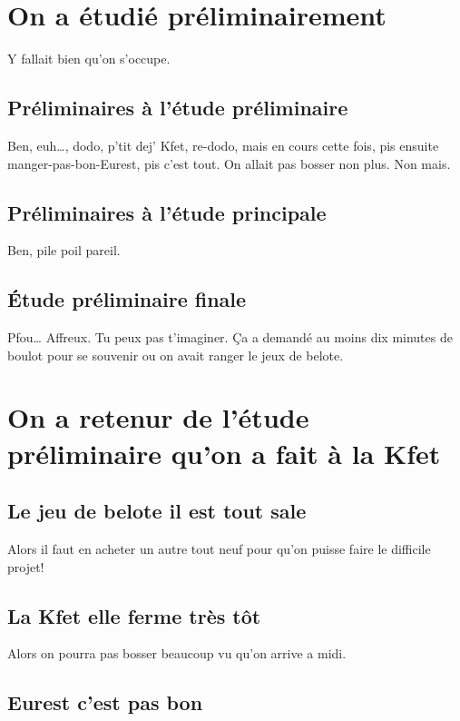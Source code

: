 \documentclass[french,12pt, a4paper,twoside,openright]{report}
\begin{document}
\chapter{On a \'etudi\'e pr\'eliminairement}

Y fallait bien qu'on s'occupe.

\section{Pr\'eliminaires \`a l'\'etude pr\'eliminaire}

Ben, euh\ldots, dodo, p'tit dej' Kfet, re-dodo, mais en cours cette fois,
pis ensuite manger-pas-bon-Eurest, pis c'est tout. On allait pas bosser
non plus. Non mais.

\section{Pr\'eliminaires \`a l'\'etude principale}

Ben, pile poil pareil.

\section{\'Etude pr\'eliminaire finale}

Pfou\ldots{} Affreux. Tu peux pas t'imaginer. \c{C}a a demand\'e au moins
dix minutes de boulot pour se souvenir ou on avait ranger le jeux de belote.

\chapter{On a retenur de l'\'etude pr\'eliminaire qu'on a fait \`a la Kfet}

\section{Le jeu de belote il est tout sale}

Alors il faut en acheter un autre tout neuf pour qu'on puisse faire le difficile
projet!

\section{La Kfet elle ferme tr\`es t\^ot}

Alors on pourra pas bosser beaucoup vu qu'on arrive a midi.

\section{Eurest c'est pas bon}
\end{document}
